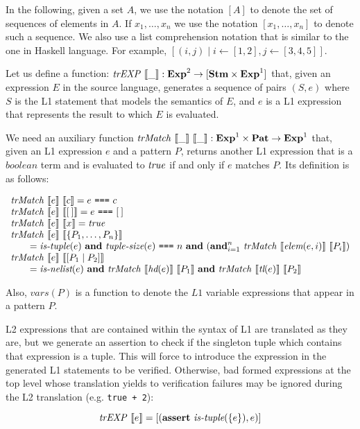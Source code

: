 In the following, given a set $A$, we use the notation $[A]$ to denote the set
of sequences of elements in $A$. If $x_1, \ldots, x_n$ we use the notation 
$[x_1, \ldots, x_n]$ to denote such a sequence. We also use a list comprehension
notation that is similar to the one in Haskell language. For example, $[(i, j)
\mid i \leftarrow [1, 2], j \leftarrow [3, 4, 5]]$.

Let us define a function: $\mathit{trEXP}~\llbracket\_\rrbracket : \mathbf{Exp}^{2} \rightarrow [\mathbf{Stm} \times
\mathbf{Exp}^{1}]$ that, given an expression $E$ in the source language, generates a
sequence of pairs $(S, e)$ where $S$ is the L1 statement that models the
semantics of $E$, and $e$ is a L1 expression that represents the result to which
$E$ is evaluated.

We need an auxiliary function $\mathit{trMatch}~\llbracket\_\rrbracket~\llbracket\_\rrbracket : \mathbf{Exp}^{1} \times \mathbf{Pat}
\rightarrow \mathbf{Exp}^{1}$ that, given an L1 expression $e$ and a pattern $P$, returns
another L1 expression that is a $\mathit{boolean}$ term and is evaluated to
$\mathit{true}$ if and only if $e$ matches $P$. Its definition is as follows:

\[
\begin{array}{l}
\mathit{trMatch}~\llbracket e\rrbracket~\llbracket c\rrbracket = e~\texttt{===}~{c}\\
\mathit{trMatch}~\llbracket e\rrbracket~\llbracket[\:]\rrbracket = e~\texttt{===}~{[\:]} \\
\mathit{trMatch}~\llbracket e\rrbracket~\llbracket x\rrbracket = \mathit{true}\\
\mathit{trMatch}~\llbracket e\rrbracket~\llbracket\{P_1,\ldots,P_n\}\rrbracket\\
\qquad = \textit{is-tuple}(e)~\mathbf{and}~\textit{tuple-size}(e)~\texttt{===}~n~\mathbf{and}~(\mathbf{and}_{i=1}^n~\mathit{trMatch}~\llbracket\textit{elem}(e, i)\rrbracket~\llbracket P_i\rrbracket)\\
\mathit{trMatch}~\llbracket e\rrbracket~\llbracket[P_1\mid P_2]\rrbracket\\
\qquad = \textit{is-nelist}(e)~\mathbf{and}~\mathit{trMatch}~\llbracket\textit{hd}(e)\rrbracket~\llbracket P_1\rrbracket~\mathbf{and}~\mathit{trMatch}~\llbracket\textit{tl}(e)\rrbracket~\llbracket P_2\rrbracket
\end{array}
\]

Also, $\mathit{vars}(P)$ is a function to denote the $L1$ variable expressions
that appear in a pattern $P$.

L2 expressions that are contained within the syntax of L1 are translated as they
are, but we generate an assertion to check if the singleton tuple which contains
that expression is a tuple. This will force to introduce the expression in the
generated L1 statements to be verified. Otherwise, bad formed expressions at the
top level whose translation yields to verification failures may be ignored
during the L2 translation (e.g. \verb|true + 2|):

\[
\mathit{trEXP}~\llbracket e\rrbracket = [(\textbf{assert}~\textit{is\mbox{-}tuple}(\{e\}), e)]
\]

